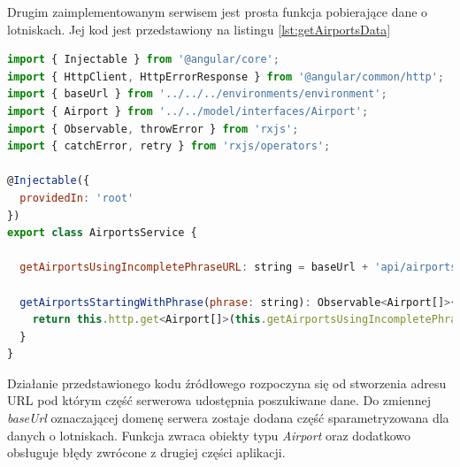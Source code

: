 \documentclass[12pt, twoside]{report}
\begin{document}
Drugim zaimplementowanym serwisem jest prosta funkcja pobierające dane o lotniskach. Jej kod jest przedstawiony na listingu \ref{lst:getAirportsData}
\begin{lstlisting}[language=JavaScript, caption= Kod źródłowy funkcji pobierającej dane lotnisk, label=lst:getAirportsData]
import { Injectable } from '@angular/core';
import { HttpClient, HttpErrorResponse } from '@angular/common/http';
import { baseUrl } from '../../../environments/environment';
import { Airport } from '../../model/interfaces/Airport';
import { Observable, throwError } from 'rxjs';
import { catchError, retry } from 'rxjs/operators';

@Injectable({
  providedIn: 'root'
})
export class AirportsService {

  getAirportsUsingIncompletePhraseURL: string = baseUrl + 'api/airports/getAirportsStartingWith/';

  getAirportsStartingWithPhrase(phrase: string): Observable<Airport[]>{
    return this.http.get<Airport[]>(this.getAirportsUsingIncompletePhraseURL + phrase).pipe(catchError(this.handleError)); 
  }  
}
\end{lstlisting}
Działanie przedstawionego kodu źródłowego rozpoczyna się od stworzenia adresu URL pod którym część serwerowa udostępnia poszukiwane dane. Do zmiennej \textit{baseUrl} oznaczającej domenę serwera zostaje dodana część sparametryzowana dla danych o lotniskach. Funkcja zwraca obiekty typu \textit{Airport} oraz dodatkowo obsługuje błędy zwrócone z drugiej części aplikacji.
\end{document}
